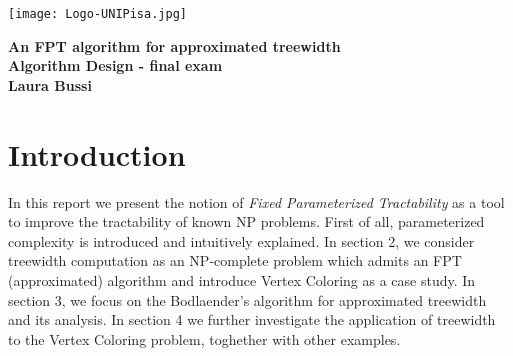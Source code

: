 \documentclass{article}
\theoremstyle{definition}
\theoremstyle{lemma}
\theoremstyle{corollary}
\theoremstyle{theorem}
\begin{document}
\begin{titlepage}

\begin{center}
\texttt{[image: Logo-UNIPisa.jpg]} 
\end{center}

\begin{center}
    {\LARGE{\bf An FPT algorithm for approximated treewidth}}\\
    \vspace{5mm}
    {\large{\bf Algorithm Design - final exam}}\\
    \vspace{2.5mm}
	{\large{\bf Laura Bussi}}\\
\end{center}
\end{titlepage}

\newpage

\tableofcontents

\newpage

\section{Introduction}
In this report we present the notion of \emph{Fixed Parameterized Tractability} as a tool to improve the tractability of known NP problems. First of all, parameterized complexity is introduced and intuitively explained. In section 2, we consider treewidth computation as an NP-complete problem which admits an FPT (approximated) algorithm and introduce Vertex Coloring as a case study. In section 3, we focus on the Bodlaender's algorithm for approximated treewidth and its analysis. In section 4 we further investigate the application of treewidth to the Vertex Coloring problem, toghether with other examples.
\end{document}
